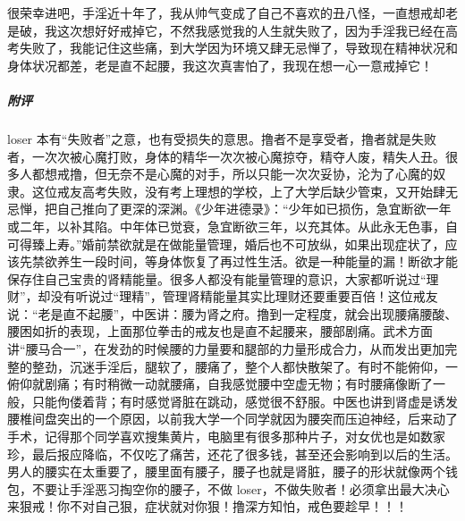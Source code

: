 \begin{case}
    很荣幸进吧，手淫近十年了，我从帅气变成了自己不喜欢的丑八怪，一直想戒却老是破，我这次想好好戒掉它，不然我感觉我的人生就失败了，因为手淫我已经在高考失败了，我能记住这些痛，到大学因为环境又肆无忌惮了，导致现在精神状况和身体状况都差，老是直不起腰，我这次真害怕了，我现在想一心一意戒掉它！
    \subparagraph{附评} loser 本有“失败者”之意，也有受损失的意思。撸者不是享受者，撸者就是失败者，一次次被心魔打败，身体的精华一次次被心魔掠夺，精夺人废，精失人丑。很多人都想戒撸，但无奈不是心魔的对手，所以只能一次次妥协，沦为了心魔的奴隶。这位戒友高考失败，没有考上理想的学校，上了大学后缺少管束，又开始肆无忌惮，把自己推向了更深的深渊。《少年进德录》：“少年如已损伤，急宜断欲一年或二年，以补其陷。中年体已觉衰，急宜断欲三年，以充其体。从此永无色事，自可得臻上寿。”婚前禁欲就是在做能量管理，婚后也不可放纵，如果出现症状了，应该先禁欲养生一段时间，等身体恢复了再过性生活。欲是一种能量的漏！断欲才能保存住自己宝贵的肾精能量。很多人都没有能量管理的意识，大家都听说过“理财”，却没有听说过“理精”，管理肾精能量其实比理财还要重要百倍！这位戒友说：“老是直不起腰”，中医讲：腰为肾之府。撸到一定程度，就会出现腰痛腰酸、腰困如折的表现，上面那位拳击的戒友也是直不起腰来，腰部剧痛。武术方面讲“腰马合一”，在发劲的时候腰的力量要和腿部的力量形成合力，从而发出更加完整的整劲，沉迷手淫后，腿软了，腰痛了，整个人都快散架了。有时不能俯仰，一俯仰就剧痛；有时稍微一动就腰痛，自我感觉腰中空虚无物；有时腰痛像断了一般，只能佝偻着背；有时感觉肾脏在跳动，感觉很不舒服。中医也讲到肾虚是诱发腰椎间盘突出的一个原因，以前我大学一个同学就因为腰突而压迫神经，后来动了手术，记得那个同学喜欢搜集黄片，电脑里有很多那种片子，对女优也是如数家珍，最后报应降临，不仅吃了痛苦，还花了很多钱，甚至还会影响到以后的生活。男人的腰实在太重要了，腰里面有腰子，腰子也就是肾脏，腰子的形状就像两个钱包，不要让手淫恶习掏空你的腰子，不做 loser，不做失败者！必须拿出最大决心来狠戒！你不对自己狠，症状就对你狠！撸深方知怕，戒色要趁早！！！
\end{case}


